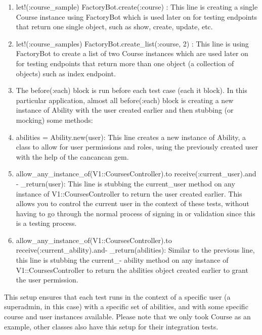 \begin{justify}
\begin{enumerate}
    \item let!(:course\_sample) { FactoryBot.create(:course) }: This line is creating a single Course instance using FactoryBot which is used later on for testing endpoints that return one single object, such as show, create, update, etc.
    \vspace{0.25cm}

    \item let!(:course\_samples) { FactoryBot.create\_list(:course, 2) }: This line is using FactoryBot to create a list of two Course instances which are used later on for testing endpoints that return more than one object (a collection of objects) such as index endpoint.
    \vspace{0.25cm}

    \item The before(:each) block is run before each test case (each it block). In this particular application, almost all before(:each) block is creating a new instance of Ability with the user created earlier and then stubbing (or mocking) some methods:
    \vspace{0.25cm}

    \item abilities = Ability.new(user): This line creates a new instance of Ability, a class to allow for user permissions and roles, using the previously created user with the help of the cancancan gem.
    \vspace{0.25cm}

    \item allow\_any\_instance\_of(V1::CoursesController).to receive(:current\_user).and - \_return(user): This line is stubbing the current\_user method on any instance of V1::CoursesController to return the user created earlier. This allows you to control the current user in the context of these tests, without having to go through the normal process of signing in or validation since this is a testing process.
    \vspace{0.25cm}
\clearpage
    \item allow\_any\_instance\_of(V1::CoursesController).to receive(:current\_ability).and- \_return(abilities): Similar to the previous line, this line is stubbing the current\_- ability method on any instance of V1::CoursesController to return the abilities object created earlier to grant the user permission.
\end{enumerate}

\vspace{0.25cm}
\newendline This setup ensures that each test runs in the context of a specific user (a superadmin, in this case) with a specific set of abilities, and with some specific course and user instances available. Please note that we only took Course as an example, other classes also have this setup for their integration tests.



\end{justify}

